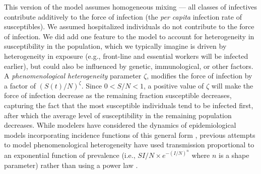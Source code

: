 \documentclass[12pt]{article}\usepackage[]{graphicx}\usepackage[]{color}
\begin{document}
This version of the model assumes homogeneous mixing --- all classes of infectives contribute additively to the force of infection (the \emph{per capita} infection rate of susceptibles).
We assumed hospitalized individuals do not contribute to the force of infection.   
We did add one feature to the model to account for heterogeneity in susceptibility in the population, which we typically imagine is driven by heterogeneity in exposure (e.g., front-line and essential workers will be infected earlier), but could also be influenced by genetic, immunological, or other factors.
A \emph{phenomenological heterogeneity} parameter $\zeta$, modifies the force of infection by a factor of $\left(S(t)/N\right)^\zeta$. Since $0 < S/N < 1$, a positive value of $\zeta$ will make the force of infection decrease as the remaining fraction susceptible decreases, capturing the fact that the most susceptible individuals tend to be infected first, after which
the average level of susceptibility in the remaining population decreases. While modelers have considered the dynamics of epidemiological models incorporating incidence functions of this general form \cite{WilsWorc+45,Liu+87}, previous attempts to model phenomenological heterogeneity have used transmission proportional to an exponential function of prevalence (i.e., $S I/N \times e^{-(I/N)^n}$ where $n$ is a shape parameter) rather than using a power law \cite{Will+06,Gran+09}. 
\end{document}
